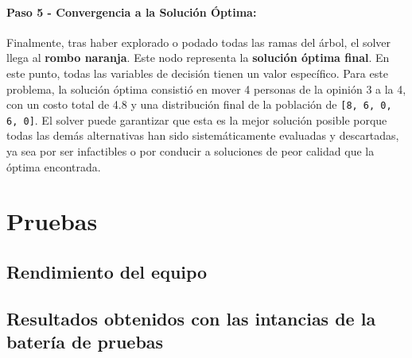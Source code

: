 \documentclass[11pt,letter]{article}
\begin{document}
\paragraph{Paso 5 - Convergencia a la Solución Óptima:}
Finalmente, tras haber explorado o podado todas las ramas del árbol, el solver llega al \textbf{rombo naranja}. Este nodo representa la \textbf{solución óptima final}. En este punto, todas las variables de decisión tienen un valor específico. Para este problema, la solución óptima consistió en mover 4 personas de la opinión 3 a la 4, con un costo total de 4.8 y una distribución final de la población de \texttt{[8, 6, 0, 6, 0]}. El solver puede garantizar que esta es la mejor solución posible porque todas las demás alternativas han sido sistemáticamente evaluadas y descartadas, ya sea por ser infactibles o por conducir a soluciones de peor calidad que la óptima encontrada.

\section{Pruebas}

\subsection{Rendimiento del equipo}

\subsection{Resultados obtenidos con las intancias de la batería de pruebas}
\end{document}
